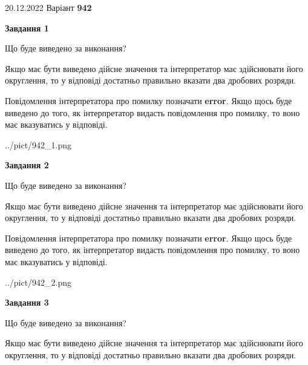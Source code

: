 \documentclass[12pt, ukrainian]{article}
\begin{document}
{20.12.2022 Варіант \No \textbf { 942 }\par}
{
\begin {Large}

{\begin {center}\textbf{Завдання 1}\end {center}}\par
Що буде виведено за виконання? \par

Якщо має бути виведено дійсне значення та інтерпретатор має здійснювати його округлення, 
то у відповіді достатньо правильно вказати два дробових розряди.

Повідомлення інтерпретатора про помилку позначати \textbf{error}.
Якщо щось буде виведено до того, як інтерпретатор видасть повідомлення про помилку, 
то воно має вказуватись у відповіді. \par

\begin{center}
	{../pict/942_1.png}
\end{center}
\newpage

{\begin {center}\textbf{Завдання 2}\end {center}}\par
Що буде виведено за виконання? \par

Якщо має бути виведено дійсне значення та інтерпретатор має здійснювати його округлення, 
то у відповіді достатньо правильно вказати два дробових розряди.

Повідомлення інтерпретатора про помилку позначати \textbf{error}.
Якщо щось буде виведено до того, як інтерпретатор видасть повідомлення про помилку, 
то воно має вказуватись у відповіді. \par

\begin{center}
	{../pict/942_2.png}
\end{center}
\newpage

{\begin {center}\textbf{Завдання 3}\end {center}}\par
Що буде виведено за виконання? \par

Якщо має бути виведено дійсне значення та інтерпретатор має здійснювати його округлення, 
то у відповіді достатньо правильно вказати два дробових розряди.


\end{Large}}
\end{document}
